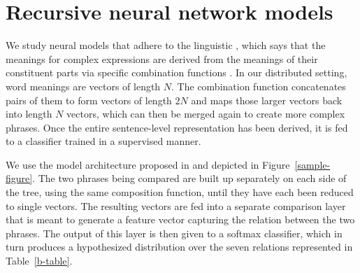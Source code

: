 
\section{Recursive neural network models} \label{methods}

We study neural models that adhere to the linguistic , which says that the meanings for complex
expressions are derived from the meanings of their constituent parts
via specific combination functions \cite{Partee84,Janssen97}. In our
distributed setting, word meanings are vectors of length $N$. The
combination function concatenates pairs of them to form vectors of
length $2N$ and maps those larger vectors back into length $N$
vectors, which can then be merged again to create more complex
phrases. Once the entire sentence-level representation has been
derived, it is fed to a classifier trained in a supervised manner.


We use the model architecture proposed in \cite{bowman2013can} and
depicted in Figure~\ref{sample-figure}. The two phrases being compared
are built up separately on each side of the tree, using the same
composition function, until they have each been reduced to single
vectors. The resulting vectors are fed into a separate comparison
layer that is meant to generate a feature vector capturing the
relation between the two phrases. The output of this layer is then
given to a softmax classifier, which in turn produces a hypothesized
distribution over the seven relations represented in Table~\ref{b-table}.


